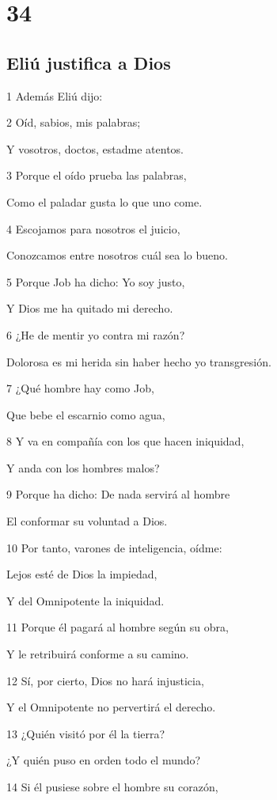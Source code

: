 \chapter{34}

\section*{Eliú justifica a Dios}

\par 1 Además Eliú dijo:
\par 2 Oíd, sabios, mis palabras;
\par Y vosotros, doctos, estadme atentos.
\par 3 Porque el oído prueba las palabras,
\par Como el paladar gusta lo que uno come.
\par 4 Escojamos para nosotros el juicio,
\par Conozcamos entre nosotros cuál sea lo bueno.
\par 5 Porque Job ha dicho: Yo soy justo,
\par Y Dios me ha quitado mi derecho.
\par 6 ¿He de mentir yo contra mi razón?
\par Dolorosa es mi herida sin haber hecho yo transgresión.
\par 7 ¿Qué hombre hay como Job,
\par Que bebe el escarnio como agua,
\par 8 Y va en compañía con los que hacen iniquidad,
\par Y anda con los hombres malos?
\par 9 Porque ha dicho: De nada servirá al hombre
\par El conformar su voluntad a Dios.
\par 10 Por tanto, varones de inteligencia, oídme:
\par Lejos esté de Dios la impiedad,
\par Y del Omnipotente la iniquidad.
\par 11 Porque él pagará al hombre según su obra,
\par Y le retribuirá conforme a su camino. 
\par 12 Sí, por cierto, Dios no hará injusticia,
\par Y el Omnipotente no pervertirá el derecho.
\par 13 ¿Quién visitó por él la tierra?
\par ¿Y quién puso en orden todo el mundo?
\par 14 Si él pusiese sobre el hombre su corazón,
